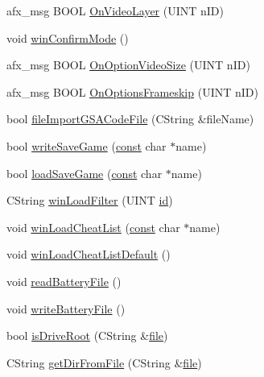 \begin{DoxyCompactItemize}
afx\+\_\+msg B\+O\+OL \mbox{\hyperlink{class_main_wnd_aba2fc4c22ea3cbda1187a08a85eeebbe}{On\+Video\+Layer}} (U\+I\+NT n\+ID)
\item 
void \mbox{\hyperlink{class_main_wnd_ac2dd4c52f72943279a8d8338edc06343}{win\+Confirm\+Mode}} ()
\item 
afx\+\_\+msg B\+O\+OL \mbox{\hyperlink{class_main_wnd_a3db1b6ad5af63ac2c3476868c015f6aa}{On\+Option\+Video\+Size}} (U\+I\+NT n\+ID)
\item 
afx\+\_\+msg B\+O\+OL \mbox{\hyperlink{class_main_wnd_a753174cb5893b2a20c004f9431d1f7aa}{On\+Options\+Frameskip}} (U\+I\+NT n\+ID)
\item 
bool \mbox{\hyperlink{class_main_wnd_af376f9dd20c49c2b0543102e321ea79c}{file\+Import\+G\+S\+A\+Code\+File}} (C\+String \&file\+Name)
\item 
bool \mbox{\hyperlink{class_main_wnd_a2ce340f4f9cfbb4ec41be6ce2e33ed23}{write\+Save\+Game}} (\mbox{\hyperlink{getopt1_8c_a2c212835823e3c54a8ab6d95c652660e}{const}} char $\ast$name)
\item 
bool \mbox{\hyperlink{class_main_wnd_ae53f005e124fddf8681dc9a31992841f}{load\+Save\+Game}} (\mbox{\hyperlink{getopt1_8c_a2c212835823e3c54a8ab6d95c652660e}{const}} char $\ast$name)
\item 
C\+String \mbox{\hyperlink{class_main_wnd_a7adc4aa2a10246fa13637e9d0870843d}{win\+Load\+Filter}} (U\+I\+NT \mbox{\hyperlink{_commands_8cpp_a7b7a6396b2c82ad46c6d8b2bf141a8dd}{id}})
\item 
void \mbox{\hyperlink{class_main_wnd_adfe445d042cd87dfa30b07fdcfa7eeff}{win\+Load\+Cheat\+List}} (\mbox{\hyperlink{getopt1_8c_a2c212835823e3c54a8ab6d95c652660e}{const}} char $\ast$name)
\item 
void \mbox{\hyperlink{class_main_wnd_a9d0fc611b92ef43d6a56c9f785051bee}{win\+Load\+Cheat\+List\+Default}} ()
\item 
void \mbox{\hyperlink{class_main_wnd_a6f37e1bbcd8c635131b84ded2786578b}{read\+Battery\+File}} ()
\item 
void \mbox{\hyperlink{class_main_wnd_a653d11c15657ad15c35073eaf892519c}{write\+Battery\+File}} ()
\item 
bool \mbox{\hyperlink{class_main_wnd_a3ee1d2026d24932c2ca0985c04fc8dd5}{is\+Drive\+Root}} (C\+String \&\mbox{\hyperlink{expr-lex_8cpp_a702945180aa732857b380a007a7e2a21}{file}})
\item 
C\+String \mbox{\hyperlink{class_main_wnd_a55c4858ec2c3f621790c9c7aec67011e}{get\+Dir\+From\+File}} (C\+String \&\mbox{\hyperlink{expr-lex_8cpp_a702945180aa732857b380a007a7e2a21}{file}})

\end{DoxyCompactItemize}
